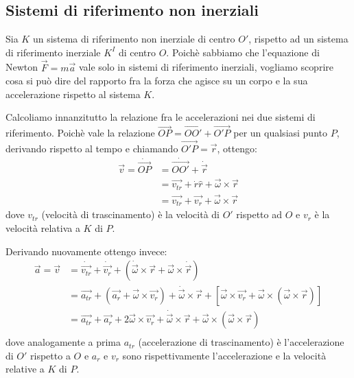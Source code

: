 \documentclass[../main.tex]{subfiles}
\begin{document}
\subsection{Sistemi di riferimento non inerziali}
Sia $K$ un sistema di riferimento non inerziale di centro $O'$, rispetto ad un sistema di riferimento
inerziale $K^I$ di centro $O$. Poichè sabbiamo che l'equazione di Newton $\overrightarrow{F}=m\overrightarrow{a}$
vale solo in sistemi di riferimento inerziali, vogliamo scoprire cosa si può dire del rapporto fra la forza
che agisce su un corpo e la sua accelerazione rispetto al sistema $K$.

Calcoliamo innanzitutto la relazione fra le accelerazioni nei due sistemi di riferimento. Poichè vale la
relazione $\overrightarrow{OP}=\overrightarrow{OO'}+\overrightarrow{O'P}$ per un qualsiasi punto $P$, derivando 
rispetto al tempo e chiamando $\overrightarrow{O'P}=\overrightarrow{r}$, ottengo:
\begin{equation}\label{VelNonInerziale}
\begin{split}
	\overrightarrow{v}=\dot{\overrightarrow{OP}}	& =\dot{\overrightarrow{OO'}}+\dot{\overrightarrow{r}}\\
													& =\overrightarrow{v_{tr}}+\dot{r}\hat{r}+\overrightarrow{\omega}\times\overrightarrow{r}\\
													& =\overrightarrow{v_{tr}}+\overrightarrow{v_r}+\overrightarrow{\omega}\times\overrightarrow{r}
\end{split}
\end{equation}
dove $v_{tr}$ (velocità di trascinamento) è la velocità di $O'$ rispetto ad $O$ e $v_r$ è la velocità relativa
a $K$ di $P$.

Derivando nuovamente ottengo invece:
\begin{equation}\label{AccNonInerziale}
\begin{split}
	\overrightarrow{a}=\overrightarrow{v}	& =\dot{\overrightarrow{v_{tr}}}+\dot{\overrightarrow{v_r}}+\left(\dot{\overrightarrow{\omega}}\times\overrightarrow{r}+\overrightarrow{\omega}\times\dot{\overrightarrow{r}}\right)\\
											& =\overrightarrow{a_{tr}}+\left(\overrightarrow{a_r}+\overrightarrow{\omega}\times\overrightarrow{v_r}\right)+\dot{\overrightarrow{\omega}}\times\overrightarrow{r}+\left[\overrightarrow{\omega}\times\overrightarrow{v_r}+\overrightarrow{\omega}\times(\overrightarrow{\omega}\times\overrightarrow{r})\right]\\
											& =\overrightarrow{a_{tr}}+\overrightarrow{a_r}+2\overrightarrow{\omega}\times\overrightarrow{v_r}+\dot{\overrightarrow{\omega}}\times\overrightarrow{r}+\overrightarrow{\omega}\times(\overrightarrow{\omega}\times\overrightarrow{r})\\
\end{split}
\end{equation}
dove analogamente a prima $a_{tr}$ (accelerazione di trascinamento) è l'accelerazione di $O'$ rispetto a $O$ e $a_r$ e 
$v_r$ sono rispettivamente l'accelerazione e la velocità relative a $K$ di $P$.
\end{document}
